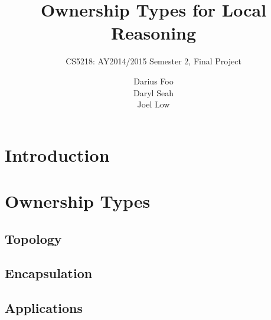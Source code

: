 \documentclass{acm_proc_article-sp}
\begin{document}
\title{Ownership Types for Local Reasoning}
\subtitle{CS5218: AY2014/2015 Semester 2, Final Project}


\author{
\alignauthor
Darius Foo\\
\alignauthor
Daryl Seah\\
\alignauthor
Joel Low\\
}



\maketitle
\begin{abstract}
	\lipsum[1]
\end{abstract}



\section{Introduction}
\label{sec:intro}


\lipsum[2]



\section{Ownership Types}
\label{sec:ownership}


\subsection{Topology}
\label{subsec:topo}

\lipsum[3]

\subsection{Encapsulation}
\label{subsec:encap}

\lipsum[4]

\subsection{Applications}
\label{subsec:apps}

\lipsum[5]
\end{document}
